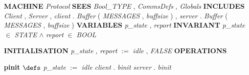 %
\bsetindent
\begin{tabbing}
\bSetTabs
%
%
\bbnl
{\bf MACHINE} \+ \bbnl
{\em Protocol\/} \-\label{Protocol}
%
%
\bbnl
{\bf SEES} \+ \bbnl
{\em Bool\_TYPE\/}\label{Bool_TYPE}  , {\em CommsDefs\/}\label{CommsDefs}  , {\em Globals\/}\label{Globals}  \-
%
%
\bbnl
{\bf INCLUDES} \+ \bbnl
{\em Client\/}\label{Client}  , {\em Server\/}\label{Server}  , \bnl
{\em client\/} . {\em Buffer\/}\label{Buffer}  ( {\em MESSAGES\/}\label{MESSAGES}  , {\em buffsize\/}\label{buffsize}  )  , \bnl
{\em server\/} . {\em Buffer\/}\label{Buffer}  ( {\em MESSAGES\/}\label{MESSAGES}  , {\em buffsize\/}\label{buffsize}  )  \-
%
%
\bbnl
{\bf VARIABLES} \+ \bbnl
{\em p\_state\/}\label{p_state}  , {\em report\/}\label{report}  \-
%
%
\bbnl
{\bf INVARIANT} \+ \bbnl
{\em p\_state\/} $\in$ {\em STATE\/}\label{STATE}  $\wedge$ \bnl
{\em report\/} $\in$ {\em BOOL\/}\label{BOOL}
\end{tabbing}
\bresetindent
%
%
\vspace{-4.5ex}\bsetindent
\begin{tabbing}
\bSetTabs
\+\> \-
%
%
\bbnl
{\bf INITIALISATION} \+ \bbnl
{\em p\_state\/} , {\em report\/} $:=$  {\em idle\/} , {\em FALSE\/} \-
%
%
\bnl\bnl
{\bf OPERATIONS} \+ \bbnl

%
%
{\bf { pinit}}  \bhsp $\defs$ \+ \bnl
  \+\bnl
{\em p\_state\/} $:=$  {\em idle\/} \bparallel \bnl
{\em client\/} . {\em binit\/}\label{binit}  \bparallel \bnl
{\em server\/} . {\em binit\/}\label{binit}  \-\bnl
{}  \- \bOperationSemiColon 
\end{tabbing}
